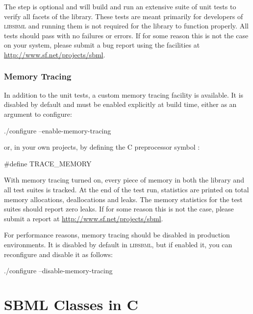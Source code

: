 \documentclass{sbmlmanual}
\newcommand{\libsbml}{\textsc{libsbml}}
\begin{document}
The  step is optional and will build and run an extensive
suite of unit tests to verify all facets of the library.  These tests are
meant primarily for developers of \libsbml{} and running them is not
required for the library to function properly.  All tests should pass with
no failures or errors.  If for some reason this is not the case on your
system, please submit a bug report using the facilities at
\url{http://www.sf.net/projects/sbml}.


\subsubsection{Memory Tracing}

In addition to the unit tests, a custom memory tracing facility is
available.  It is disabled by default and must be enabled explicitly
at build time, either as an argument to configure:

\begin{example}[csh]
  ./configure --enable-memory-tracing
\end{example}

or, in your own projects, by defining the C preprocessor symbol
:

\begin{example}[c]
  #define TRACE_MEMORY
\end{example}

With memory tracing turned on, every piece of memory in both the library
and all test suites is tracked.  At the end of the test run, statistics are
printed on total memory allocations, deallocations and leaks.  The memory
statistics for the test suites should report zero leaks.  If for some
reason this is not the case, please submit a report at
\url{http://www.sf.net/projects/sbml}.

For performance reasons, memory tracing should be disabled in production
environments.  It is disabled by default in \libsbml{}, but if enabled it,
you can reconfigure and disable it as follows:

\begin{example}[csh]
  ./configure --disable-memory-tracing
\end{example}




\section{SBML Classes in C}
\label{sec:sbml-classes-in-c}
\end{document}
